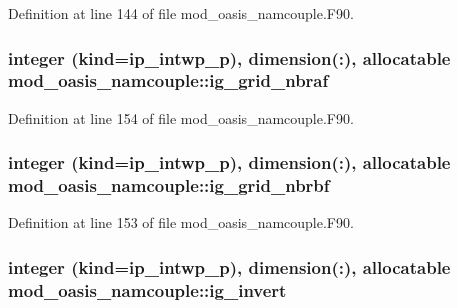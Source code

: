 Definition at line 144 of file mod\+\_\+oasis\+\_\+namcouple.\+F90.

\hypertarget{classmod__oasis__namcouple_a8e8c38746c6c35b13d2d9b934835188c}{
\subsubsection[{ig\+\_\+grid\+\_\+nbraf}]{\setlength{\rightskip}{0pt plus 5cm}integer (kind=ip\+\_\+intwp\+\_\+p), dimension(\+:), allocatable mod\+\_\+oasis\+\_\+namcouple\+::ig\+\_\+grid\+\_\+nbraf\hspace{0.3cm}{\ttfamily [private]}}}\label{classmod__oasis__namcouple_a8e8c38746c6c35b13d2d9b934835188c}


Definition at line 154 of file mod\+\_\+oasis\+\_\+namcouple.\+F90.

\hypertarget{classmod__oasis__namcouple_ae81f2e658bbaeae20badef0fad425a69}{
\subsubsection[{ig\+\_\+grid\+\_\+nbrbf}]{\setlength{\rightskip}{0pt plus 5cm}integer (kind=ip\+\_\+intwp\+\_\+p), dimension(\+:), allocatable mod\+\_\+oasis\+\_\+namcouple\+::ig\+\_\+grid\+\_\+nbrbf\hspace{0.3cm}{\ttfamily [private]}}}\label{classmod__oasis__namcouple_ae81f2e658bbaeae20badef0fad425a69}


Definition at line 153 of file mod\+\_\+oasis\+\_\+namcouple.\+F90.

\hypertarget{classmod__oasis__namcouple_a0b8948452bbd8cf1dc9f0fccc17c344d}{
\subsubsection[{ig\+\_\+invert}]{\setlength{\rightskip}{0pt plus 5cm}integer (kind=ip\+\_\+intwp\+\_\+p), dimension(\+:), allocatable mod\+\_\+oasis\+\_\+namcouple\+::ig\+\_\+invert\hspace{0.3cm}{\ttfamily [private]}}}\label{classmod__oasis__namcouple_a0b8948452bbd8cf1dc9f0fccc17c344d}



